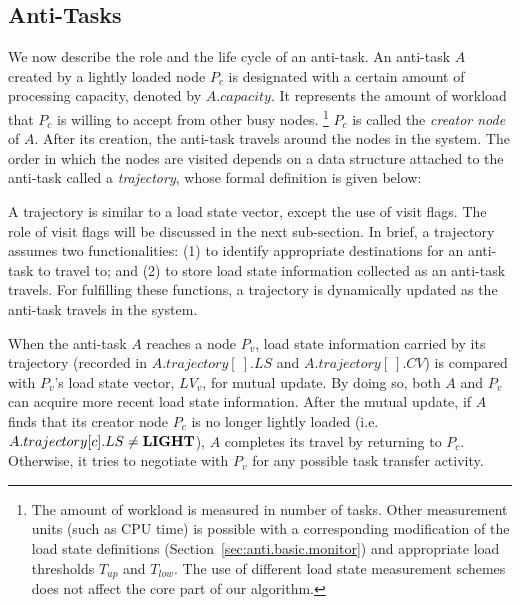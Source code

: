 \subsection {Anti-Tasks}

We now describe the role and the life cycle of an anti-task.
An anti-task $A$ created by a lightly loaded node $P_c$
is designated with a certain amount of processing capacity,
denoted by $A.capacity$.
It represents the amount of workload that
$P_c$ is willing to accept from other busy nodes.
\footnote{
        The amount of workload is measured in
        number of tasks. Other measurement units
        (such as CPU time) is possible with a corresponding
        modification of the load state definitions
        (Section~\ref{sec:anti.basic.monitor}) and
        appropriate load thresholds $T_{up}$ and $T_{low}$.
        The use of different load state measurement schemes
        does not affect the core part of our algorithm.
}
$P_c$ is called the {\it creator node\/} of $A$.
%
After its creation, 
the anti-task travels around the nodes in the system.
The order in which the nodes are visited depends on a data structure
attached to the anti-task called a {\it trajectory\/},
whose formal definition is given below:



A trajectory is similar to a load state vector, except 
the use of visit flags.
The role of visit flags will be discussed in the next sub-section.
In brief, a trajectory assumes two functionalities:
(1) to identify appropriate destinations for an anti-task to travel to; and
(2) to store load state information collected as an anti-task travels.
For fulfilling these functions, a trajectory is dynamically updated
as the anti-task travels in the system.


When the anti-task $A$ reaches a node $P_v$,
load state information carried by its trajectory
(recorded in $A.trajectory[\ ].LS$ and $A.trajectory[\ ].CV$)
is compared with $P_v$'s load state vector, $LV_v$, for mutual update.
By doing so, both $A$ and $P_v$
can acquire more recent load state information.
After the mutual update, if $A$ finds that
its creator node $P_c$ is no longer lightly loaded
(i.e. $A.trajectory[c].LS \neq \mbox{\bf LIGHT}$),
$A$ completes its travel by returning to $P_c$.
Otherwise, it tries to negotiate with $P_v$ for any possible
task transfer activity.

